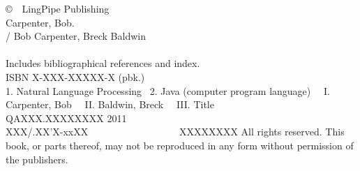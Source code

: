 \clearpage
\pagestyle{empty}
\vspace*{1.25in}
\noindent
{\footnotesize%
\copyright \ \ LingPipe Publishing
\hfill
\vfill
\vfill
{}
\\[6pt]
Carpenter, Bob.
\\
\hspace*{0.125in}{\it Text Analysis with LingPipe 4.0} / Bob
Carpenter, Breck Baldwin
\\
\hspace*{.5in}{p. cm.}
\\
\hspace*{0.125in}Includes bibliographical references and index.
\\
\hspace*{0.125in}ISBN X-XXX-XXXXX-X (pbk.)
\\[4pt]
1. Natural Language Processing  \ 2. Java (computer program language)
\ \ I. Carpenter, Bob \ \ II. Baldwin, Breck \ \ III. Title
\\[2pt]
\hspace*{0.125in}QAXXX.XXXXXXXX 2011
\\[2pt]
\hspace*{0.125in}XXX/.XX'X-xxXX      \ \ \ \ \ \ \ \ \ \ \ \ \ \ \ \ \  \ XXXXXXXX
\vfill
All rights reserved. This book, or parts thereof, may not
be reproduced in any form without permission of the publishers.
}

